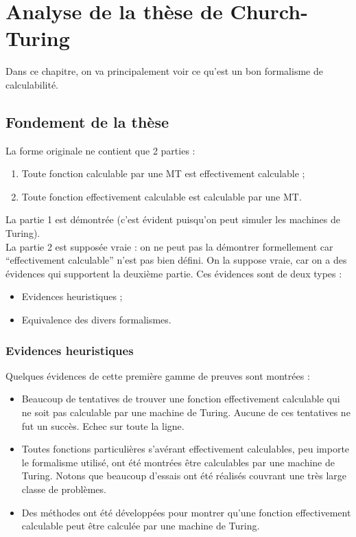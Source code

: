
\chapter{Analyse de la thèse de Church-Turing}
\label{sec:analyse_de_la_th_se_de_church_turing}
Dans ce chapitre, on va principalement voir ce qu'est un bon formalisme de calculabilité.

\section{Fondement de la thèse}
\label{sub:fondement_de_la_th_se}
\begin{mythese}
La forme originale ne contient que 2 parties :
\begin{enumerate}
	\item Toute fonction calculable par une MT est effectivement calculable ;
	\item Toute fonction effectivement calculable est calculable par une MT.
\end{enumerate}
\end{mythese}

La partie 1 est démontrée (c'est évident puisqu'on peut simuler les machines de Turing).\\

La partie 2 est supposée vraie : on ne peut pas la démontrer formellement car ``effectivement calculable'' n'est pas bien défini. 
On la suppose vraie, car on a des évidences qui supportent la deuxième partie. Ces évidences sont de deux types :
\begin{itemize}
\item Evidences heuristiques ;
\item Equivalence des divers formalismes.
\end{itemize}
\subsection{Evidences heuristiques}
Quelques évidences de cette première gamme de preuves sont montrées :
\begin{itemize}
\item Beaucoup de tentatives de trouver une fonction effectivement calculable qui ne soit pas calculable par une machine de Turing. Aucune de ces tentatives ne fut un succès. Echec sur toute la ligne.
\item Toutes fonctions particulières s'avérant effectivement calculables, peu importe le formalisme utilisé, ont été montrées être calculables par une machine de Turing. Notons que beaucoup d'essais ont été réalisés couvrant une très large classe de problèmes.
\item Des méthodes ont été développées pour montrer qu'une fonction effectivement calculable peut être calculée par une machine de Turing.
\end{itemize}


